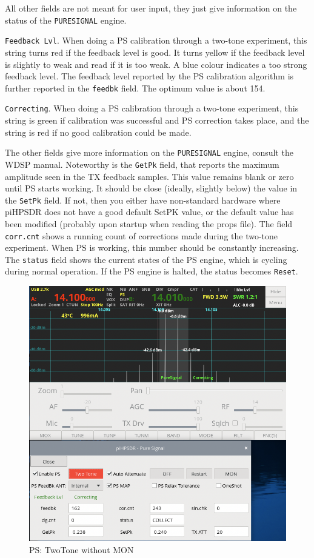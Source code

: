 \documentclass[12pt]{book}
\def\rett#1{\texttt{\color{red}#1}}
\def\bltt#1{\texttt{\color{blue}#1}}
\def\pH{pi\-HPSDR\xspace}
\begin{document}
All other fields are not meant for user input, they just give information on the status
of the \texttt{PURESIGNAL} engine.

\rett{Feedback Lvl}. When doing a PS calibration through a two-tone experiment, this string
turns red if the feedback level is good. It turns yellow if the feedback level is slightly
to weak and read if it is too weak. A blue colour indicates a too strong feedback level.
The feedback level reported by the PS calibration algorithm is further reported in the
\rett{feedbk} field. The optimum value is about 154.

\rett{Correcting}. When doing a PS calibration through a two-tone experiment, this string
is green if calibration was successful and PS correction takes place, and the string is
red if no good calibration could be made.

The other fields give more information on the \texttt{PURESIGNAL} engine, consult the
WDSP manual. Noteworthy is the \rett{GetPk} field, that reports the maximum amplitude
seen in the TX feedback samples. This value remains blank or zero until PS starts working.
It should be close (ideally, slightly below) the value in the \texttt{SetPk} field.
If not, then you either have non-standard hardware where \pH does not have a good
default SetPK value, or the default value has been modified (probably upon startup
when reading the props file). The field \rett{corr.cnt} shows a running count of corrections
made during the two-tone experiment. When PS is working, this number should be constantly
increasing. The \rett{status} field shows the current states of
the PS engine, which is cycling during normal operation. If the PS engine is halted,
the status becomes \bltt{Reset}.

\begin{figure}[t!]
\center
\includegraphics[scale=0.45]{PSnomon.png}
\caption{PS: TwoTone without MON}
\label{fig:PSnomon}
\end{figure}
\end{document}
